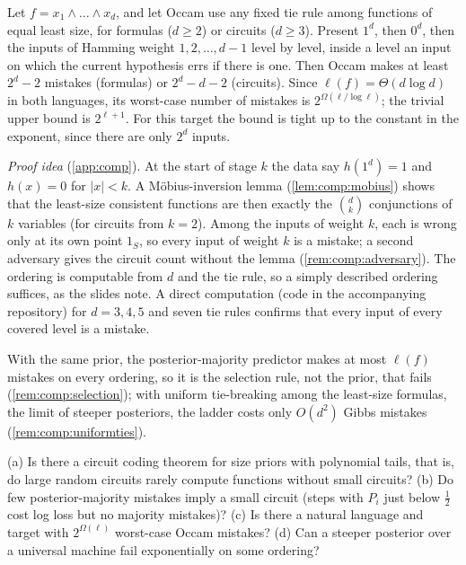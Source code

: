 \begin{theorem}\label{thm:comp:ladder}
Let $f=x_1\wedge\dots\wedge x_d$, and let Occam use any fixed tie rule among functions of equal least size, for formulas ($d\ge2$) or circuits ($d\ge3$). Present $1^d$, then $0^d$, then the inputs of Hamming weight $1,2,\dots,d-1$ level by level, inside a level an input on which the current hypothesis errs if there is one. Then Occam makes at least $2^d-2$ mistakes (formulas) or $2^d-d-2$ (circuits). Since $\ell(f)=\Theta(d\log d)$ in both languages, its worst-case number of mistakes is $2^{\Omega(\ell/\log\ell)}$; the trivial upper bound is $2^{\ell+1}$. For this target the bound is tight up to the constant in the exponent, since there are only $2^d$ inputs.
\end{theorem}

\emph{Proof idea} (\cref{app:comp}). At the start of stage $k$ the data say $h(1^d)=1$ and $h(x)=0$ for $|x|<k$. A M\"obius-inversion lemma (\cref{lem:comp:mobius}) shows that the least-size consistent functions are then exactly the $\binom dk$ conjunctions of $k$ variables (for circuits from $k=2$). Among the inputs of weight $k$, each is wrong only at its own point $1_S$, so every input of weight $k$ is a mistake; a second adversary gives the circuit count without the lemma (\cref{rem:comp:adversary}). The ordering is computable from $d$ and the tie rule, so a simply described ordering suffices, as the slides note. A direct computation (code in the accompanying repository) for $d=3,4,5$ and seven tie rules confirms that every input of every covered level is a mistake.

With the same prior, the posterior-majority predictor makes at most $\ell(f)$ mistakes on every ordering, so it is the selection rule, not the prior, that fails (\cref{rem:comp:selection}); with uniform tie-breaking among the least-size formulas, the limit of steeper posteriors, the ladder costs only $O(d^2)$ Gibbs mistakes (\cref{rem:comp:uniformties}).

\begin{question}\label{q:comp:open}
(a) Is there a circuit coding theorem for size priors with polynomial tails, that is, do large random circuits rarely compute functions without small circuits? (b) Do few posterior-majority mistakes imply a small circuit (steps with $P_i$ just below $\frac12$ cost log loss but no majority mistakes)? (c) Is there a natural language and target with $2^{\Omega(\ell)}$ worst-case Occam mistakes? (d) Can a steeper posterior over a universal machine fail exponentially on some ordering?
\end{question}
